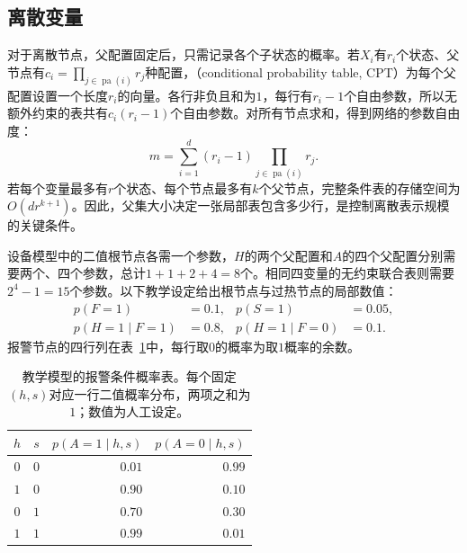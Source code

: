 \subsection{离散变量}
\label{sec:pgm-directed-discrete}

对于离散节点，父配置固定后，只需记录各个子状态的概率。若$X_i$有$r_i$个状态、父节点有$c_i=\prod_{j\in\operatorname{pa}(i)}r_j$种配置，（conditional probability table, CPT）为每个父配置设置一个长度$r_i$的向量。各行非负且和为$1$，每行有$r_i-1$个自由参数，所以无额外约束的表共有$c_i(r_i-1)$个自由参数。对所有节点求和，得到网络的参数自由度：
\begin{equation}
  m=\sum_{i=1}^{d}(r_i-1)
       \prod_{j\in\operatorname{pa}(i)}r_j.
  \label{eq:pgm-directed-cpt-size}
\end{equation}
若每个变量最多有$r$个状态、每个节点最多有$k$个父节点，完整条件表的存储空间为$O(dr^{k+1})$。因此，父集大小决定一张局部表包含多少行，是控制离散表示规模的关键条件。

设备模型中的二值根节点各需一个参数，$H$的两个父配置和$A$的四个父配置分别需要两个、四个参数，总计$1+1+2+4=8$个。相同四变量的无约束联合表则需要$2^4-1=15$个参数。以下教学设定给出根节点与过热节点的局部数值：
\[
  \begin{aligned}
    p(F=1)&=0.1,& p(S=1)&=0.05,\\
    p(H=1\mid F=1)&=0.8,&
    p(H=1\mid F=0)&=0.1.
  \end{aligned}
\]
报警节点的四行列在表~\ref{tab:pgm-directed-alarm-cpt}中，每行取$0$的概率为取$1$概率的余数。

\begin{table}[htbp]
  \centering
  \begin{tabular}{@{}ccrr@{}}
    \toprule
    $h$ & $s$ & $p(A=1\mid h,s)$ & $p(A=0\mid h,s)$ \\
    \midrule
    $0$ & $0$ & $0.01$ & $0.99$ \\
    $1$ & $0$ & $0.90$ & $0.10$ \\
    $0$ & $1$ & $0.70$ & $0.30$ \\
    $1$ & $1$ & $0.99$ & $0.01$ \\
    \bottomrule
  \end{tabular}
  \caption{教学模型的报警条件概率表。每个固定$(h,s)$对应一行二值概率分布，两项之和为$1$；数值为人工设定。}
  \label{tab:pgm-directed-alarm-cpt}
\end{table}

